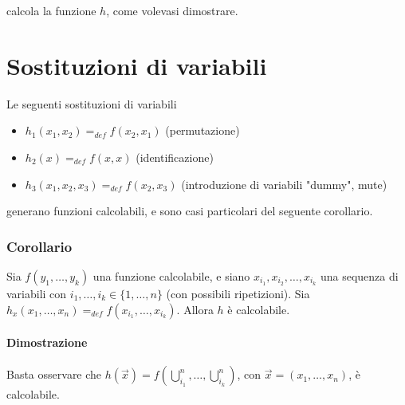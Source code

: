 calcola la funzione $h$, come volevasi dimostrare.

	\section{Sostituzioni di variabili}
	Le  seguenti sostituzioni di variabili
	
	\begin{itemize}
		\item $h_1(x_1,x_2) =_{def} f(x_2,x_1)$ (permutazione)
		\item $h_2(x) =_{def} f(x,x)$ (identificazione)
		\item $h_3(x_1,x_2,x_3) =_{def} f(x_2,x_3)$ (introduzione di variabili "dummy", mute)
	\end{itemize}
	
	generano funzioni calcolabili, e sono casi particolari del seguente corollario.
	
	\subsubsection{Corollario} Sia $f(y_1, \dots, y_k)$ una funzione calcolabile, e siano $x_{i_1}, x_{i_2}, \dots, x_{i_k}$ una sequenza di variabili con $i_1, \dots, i_k \in \{1, \dots, n\}$ (con possibili ripetizioni). Sia $h_x(x_1, \dots, x_n) =_{def}  f(x_{i_1}, \dots, x_{i_k})$. Allora $h$ è calcolabile. 
	
	\paragraph{Dimostrazione} Basta osservare che $h(\vec{x}) = f\left(\bigcup_{i_1}^n, \dots, \bigcup_{i_k}^n\right)$, con $\vec{x} = (x_1,\dots,x_n)$, è calcolabile.
	
	